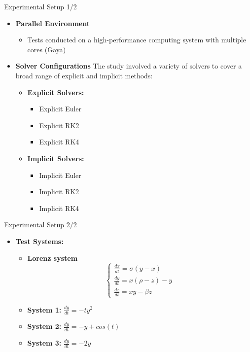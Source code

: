 \documentclass[aspectratio=169,xcolor=dvipsnames, t]{beamer}
\begin{document}
\begin{frame}{Experimental Setup 1/2}
    \begin{itemize}
        \item \textbf{Parallel Environment}
        \begin{itemize}
            \item Tests conducted on a high-performance computing system with multiple cores (Gaya)
            
        \end{itemize}
        \item \textbf{ Solver Configurations}
        \newline
        The study involved a variety of solvers to cover a broad range of explicit and implicit methods:
        \begin{itemize}
            \item \textbf{Explicit Solvers:}
            \begin{itemize}
                \item Explicit Euler
                \item Explicit RK2
                \item Explicit RK4
            \end{itemize}
            \item \textbf{Implicit Solvers:}
            \begin{itemize}
                \item Implicit Euler
                \item Implicit RK2
                \item Implicit RK4
            \end{itemize}
        \end{itemize}

    \end{itemize}
\end{frame}

\begin{frame}{Experimental Setup 2/2}
\begin{itemize}
    \item \textbf{Test Systems:}
    \begin{itemize}
        \item \textbf{Lorenz system }
        $$
        \begin{cases}
        \displaystyle\frac{dx}{dt} = \sigma(y - x) \\
        \displaystyle\frac{dy}{dt} = x(\rho - z) - y \\
        \displaystyle\frac{dz}{dt} = xy - \beta z
        \end{cases}
        $$
        \item \textbf{System 1:}
        $
            \frac{dy}{dt} = -ty^2
        $
        \item \textbf{System 2:}
        $
            \frac{dy}{dt} = -y+ cos(t)
        $
        \item \textbf{System 3:}
        $
            \frac{dy}{dt} = -2y
        $
    \end{itemize}
\end{itemize}
    
\end{frame}
\end{document}

